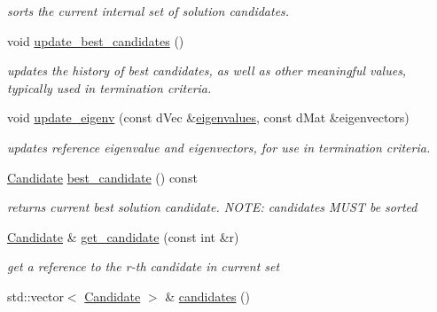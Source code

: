 \begin{DoxyCompactItemize}
\begin{DoxyCompactList}\small\item\em sorts the current internal set of solution candidates. \end{DoxyCompactList}\item 
void \hyperlink{classlibcmaes_1_1CMASolutions_a207c159be5f8668f018d564a1adb8dc8}{update\-\_\-best\-\_\-candidates} ()
\begin{DoxyCompactList}\small\item\em updates the history of best candidates, as well as other meaningful values, typically used in termination criteria. \end{DoxyCompactList}\item 
void \hyperlink{classlibcmaes_1_1CMASolutions_a28a20c0a90712e4f28038af2a4bd320b}{update\-\_\-eigenv} (const d\-Vec \&\hyperlink{classlibcmaes_1_1CMASolutions_add38348a9496b9559e72a020b952a262}{eigenvalues}, const d\-Mat \&eigenvectors)
\begin{DoxyCompactList}\small\item\em updates reference eigenvalue and eigenvectors, for use in termination criteria. \end{DoxyCompactList}\item 
\hyperlink{classlibcmaes_1_1Candidate}{Candidate} \hyperlink{classlibcmaes_1_1CMASolutions_a218f2ee7bbd91d385f23082bfe18b1d9}{best\-\_\-candidate} () const 
\begin{DoxyCompactList}\small\item\em returns current best solution candidate. N\-O\-T\-E\-: candidates M\-U\-S\-T be sorted \end{DoxyCompactList}\item 
\hyperlink{classlibcmaes_1_1Candidate}{Candidate} \& \hyperlink{classlibcmaes_1_1CMASolutions_afd3a88bc8d118c0b72f916025ca9c65b}{get\-\_\-candidate} (const int \&r)
\begin{DoxyCompactList}\small\item\em get a reference to the r-\/th candidate in current set \end{DoxyCompactList}\item 
\hypertarget{classlibcmaes_1_1CMASolutions_a47b162f936193f0f80322503a469a6aa}{std\-::vector$<$ \hyperlink{classlibcmaes_1_1Candidate}{Candidate} $>$ \& \hyperlink{classlibcmaes_1_1CMASolutions_a47b162f936193f0f80322503a469a6aa}{candidates} ()}\label{classlibcmaes_1_1CMASolutions_a47b162f936193f0f80322503a469a6aa}


\end{DoxyCompactItemize}
